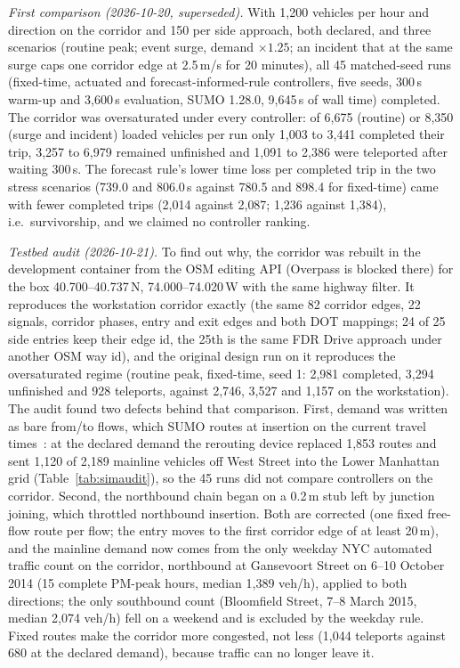 \textit{First comparison (2026-10-20, superseded).} With 1{,}200 vehicles per hour and direction on the corridor and
150 per side approach, both declared, and three scenarios (routine peak; event surge, demand $\times 1.25$; an
incident that at the same surge caps one corridor edge at 2.5\,m/s for 20 minutes), all 45 matched-seed runs (fixed-time,
actuated and forecast-informed-rule controllers, five seeds, 300\,s warm-up and 3{,}600\,s evaluation, SUMO 1.28.0,
9{,}645\,s of wall time) completed. The corridor was oversaturated under every controller: of
6{,}675 (routine) or 8{,}350 (surge and incident) loaded vehicles per run only 1{,}003 to 3{,}441 completed their trip,
3{,}257 to 6{,}979 remained unfinished and 1{,}091 to 2{,}386 were teleported after waiting 300\,s. The forecast rule's
lower time loss per completed trip in the two stress scenarios (739.0 and 806.0\,s against 780.5 and 898.4 for
fixed-time) came with fewer completed trips (2{,}014 against 2{,}087; 1{,}236 against 1{,}384), i.e.\ survivorship,
and we claimed no controller ranking.

\textit{Testbed audit (2026-10-21).} To find out why, the corridor was rebuilt in the development container from the
OSM editing API (Overpass is blocked there) for the box 40.700--40.737\,N, 74.000--74.020\,W with the same highway
filter. It reproduces the workstation corridor exactly (the same 82 corridor edges, 22 signals, corridor phases, entry
and exit edges and both DOT mappings; 24 of 25 side entries keep their edge id, the 25th is the same FDR Drive approach
under another OSM way id), and the original design run on it reproduces the oversaturated regime (routine peak,
fixed-time, seed 1: 2{,}981 completed, 3{,}294 unfinished and 928 teleports, against 2{,}746, 3{,}527 and 1{,}157 on
the workstation). The audit found two defects behind that comparison. First, demand was written as bare
from/to flows, which SUMO routes at insertion on the current travel times~\cite{sumodocs_routing}: at the declared
demand the rerouting device replaced 1{,}853 routes and sent 1{,}120 of 2{,}189 mainline vehicles off West Street into
the Lower Manhattan grid (Table~\ref{tab:simaudit}), so the 45 runs did not compare controllers on the corridor.
Second, the northbound chain began on a 0.2\,m stub left by junction joining, which throttled northbound insertion.
Both are corrected (one fixed free-flow route per flow; the entry moves to the first corridor edge of at least 20\,m),
and the mainline demand now comes from the only weekday NYC automated traffic count on the corridor, northbound at
Gansevoort Street on 6--10 October 2014 (15 complete PM-peak hours, median 1{,}389 veh/h), applied to both directions;
the only southbound count (Bloomfield Street, 7--8 March 2015, median 2{,}074 veh/h) fell on a weekend and is excluded
by the weekday rule. Fixed routes make the corridor more congested, not less (1{,}044 teleports against 680 at the
declared demand), because traffic can no longer leave it.

